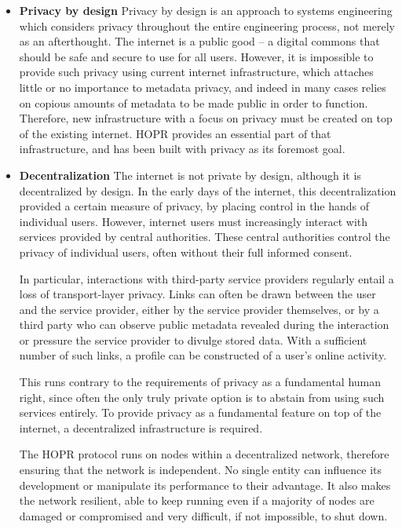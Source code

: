 \begin{itemize}

    \item \textbf{Privacy by design}
          Privacy by design is an approach to systems engineering which considers privacy throughout the entire engineering process, not merely as an afterthought. The internet is a public good – a digital commons that should be safe and secure to use for all users. However, it is impossible to provide such privacy using current internet infrastructure, which attaches little or no importance to metadata privacy, and indeed in many cases relies on copious amounts of metadata to be made public in order to function. Therefore, new infrastructure with a focus on privacy must be created on top of the existing internet. HOPR provides an essential part of that infrastructure, and has been built with privacy as its foremost goal.

    \item \textbf{Decentralization}
          The internet is not private by design, although it is decentralized by design. In the early days of the internet, this decentralization provided a certain measure of privacy, by placing control in the hands of individual users. However, internet users must increasingly interact with services provided by central authorities. These central authorities control the privacy of individual users, often without their full informed consent.

          In particular, interactions with third-party service providers regularly entail a loss of transport-layer privacy. Links can often be drawn between the user and the service provider, either by the service provider themselves, or by a third party who can observe public metadata revealed during the interaction or pressure the service provider to divulge stored data. With a sufficient number of such links, a profile can be constructed of a user's online activity.

          This runs contrary to the requirements of privacy as a fundamental human right, since often the only truly private option is to abstain from using such services entirely. To provide privacy as a fundamental feature on top of the internet, a decentralized infrastructure is required.

          The HOPR protocol runs on nodes within a decentralized network, therefore ensuring that the network is independent. No single entity can influence its development or manipulate its performance to their advantage. It also makes the network resilient, able to keep running even if a majority of nodes are damaged or compromised and very difficult, if not impossible, to shut down.


\end{itemize}
